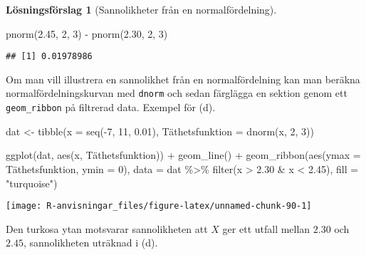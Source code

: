 \documentclass[
]{book}
\newenvironment{Shaded}{\begin{snugshade}}{\end{snugshade}}
\newcommand{\AttributeTok}[1]{\textcolor[rgb]{0.77,0.63,0.00}{#1}}
\newcommand{\DecValTok}[1]{\textcolor[rgb]{0.00,0.00,0.81}{#1}}
\newcommand{\FloatTok}[1]{\textcolor[rgb]{0.00,0.00,0.81}{#1}}
\newcommand{\FunctionTok}[1]{\textcolor[rgb]{0.00,0.00,0.00}{#1}}
\newcommand{\NormalTok}[1]{#1}
\newcommand{\OtherTok}[1]{\textcolor[rgb]{0.56,0.35,0.01}{#1}}
\newcommand{\SpecialCharTok}[1]{\textcolor[rgb]{0.00,0.00,0.00}{#1}}
\newcommand{\StringTok}[1]{\textcolor[rgb]{0.31,0.60,0.02}{#1}}
\theoremstyle{definition}
\theoremstyle{definition}
\theoremstyle{definition}
\theoremstyle{definition}
\newtheorem{hypothesis}{Lösningsförslag}[chapter]
\theoremstyle{remark}
\begin{document}
\begin{hypothesis}[Sannolikheter från en normalfördelning]
\begin{Shaded}
\begin{Highlighting}[]
\FunctionTok{pnorm}\NormalTok{(}\FloatTok{2.45}\NormalTok{, }\DecValTok{2}\NormalTok{, }\DecValTok{3}\NormalTok{) }\SpecialCharTok{{-}} \FunctionTok{pnorm}\NormalTok{(}\FloatTok{2.30}\NormalTok{, }\DecValTok{2}\NormalTok{, }\DecValTok{3}\NormalTok{)}
\end{Highlighting}
\end{Shaded}

\begin{verbatim}
## [1] 0.01978986
\end{verbatim}

Om man vill illustrera en sannolikhet från en normalfördelning kan man beräkna normalfördelningskurvan med \texttt{dnorm} och sedan färglägga en sektion genom ett \texttt{geom\_ribbon} på filtrerad data. Exempel för (d).

\begin{Shaded}
\begin{Highlighting}[]
\NormalTok{dat }\OtherTok{\textless{}{-}} \FunctionTok{tibble}\NormalTok{(}\AttributeTok{x =} \FunctionTok{seq}\NormalTok{(}\SpecialCharTok{{-}}\DecValTok{7}\NormalTok{, }\DecValTok{11}\NormalTok{, }\FloatTok{0.01}\NormalTok{),}
\NormalTok{              Täthetsfunktion }\OtherTok{=} \FunctionTok{dnorm}\NormalTok{(x, }\DecValTok{2}\NormalTok{, }\DecValTok{3}\NormalTok{))}

\FunctionTok{ggplot}\NormalTok{(dat, }\FunctionTok{aes}\NormalTok{(x, Täthetsfunktion)) }\SpecialCharTok{+}
  \FunctionTok{geom\_line}\NormalTok{() }\SpecialCharTok{+}
  \FunctionTok{geom\_ribbon}\NormalTok{(}\FunctionTok{aes}\NormalTok{(}\AttributeTok{ymax =}\NormalTok{ Täthetsfunktion, }\AttributeTok{ymin =} \DecValTok{0}\NormalTok{), }
              \AttributeTok{data =}\NormalTok{ dat }\SpecialCharTok{\%\textgreater{}\%} \FunctionTok{filter}\NormalTok{(x }\SpecialCharTok{\textgreater{}} \FloatTok{2.30} \SpecialCharTok{\&}\NormalTok{ x }\SpecialCharTok{\textless{}} \FloatTok{2.45}\NormalTok{),}
              \AttributeTok{fill =} \StringTok{"turquoise"}\NormalTok{)}
\end{Highlighting}
\end{Shaded}

\begin{center}\texttt{[image: R-anvisningar\_files/figure-latex/unnamed-chunk-90-1]} \end{center}

Den turkosa ytan motsvarar sannolikheten att \(X\) ger ett utfall mellan \(2.30\) och \(2.45\), sannolikheten uträknad i (d).


\end{hypothesis}
\end{document}
